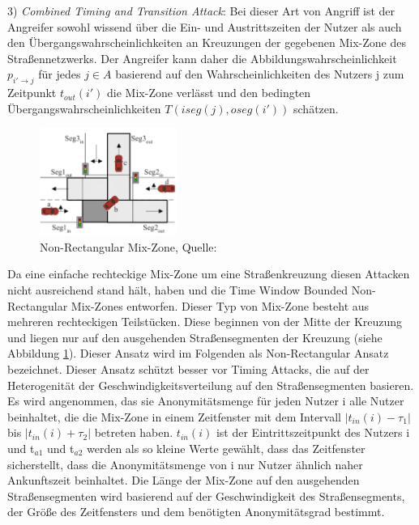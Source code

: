 3)	\textit{Combined  Timing and Transition Attack}: Bei dieser Art von Angriff ist der Angreifer sowohl wissend über die Ein- und Austrittszeiten der Nutzer als auch den Übergangswahrscheinlichkeiten an Kreuzungen der gegebenen Mix-Zone des Straßennetzwerks. Der Angreifer kann  daher die Abbildungswahrscheinlichkeit $p_{i'\rightarrow j}$ für jedes $j \in A$ basierend auf den Wahrscheinlichkeiten des Nutzers j zum Zeitpunkt $t_{out}(i')$ die Mix-Zone verlässt und den bedingten Übergangswahrscheinlichkeiten $T(iseg(j), oseg(i'))$ schätzen. 

\begin{figure}[!h]
	\centering
	\includegraphics[width=0.4\textwidth]{Bilder/nonrectangularMix.PNG}
	\caption{Non-Rectangular Mix-Zone, Quelle: \protect\cite{Chow2011}}
	\label{fig_MixSrasseNon}
\end{figure}

Da eine einfache rechteckige Mix-Zone um eine Straßenkreuzung diesen Attacken nicht ausreichend stand hält, haben \cite{Palanisamy2015} und \cite{Palanisamy2011} die Time Window Bounded Non-Rectangular Mix-Zones entworfen. Dieser Typ von Mix-Zone besteht aus mehreren rechteckigen Teilstücken.  Diese beginnen von der Mitte der Kreuzung und liegen nur auf den ausgehenden Straßensegmenten der Kreuzung (siehe Abbildung \ref{fig_MixSrasseNon}). Dieser Ansatz wird im Folgenden als Non-Rectangular Ansatz bezeichnet. Dieser Ansatz schützt besser vor Timing Attacks, die auf der Heterogenität der Geschwindigkeitsverteilung auf den Straßensegmenten basieren. Es wird angenommen, das sie Anonymitätsmenge für jeden Nutzer i alle Nutzer beinhaltet, die die Mix-Zone in einem Zeitfenster mit dem Intervall $| t_{in}(i)-\tau_{1}|$ bis $|t_{in}(i)+\tau_{2}|$ betreten haben. $t_{in}(i)$ ist der Eintrittszeitpunkt des Nutzers i und t$_{a1}$ und t$_{a2}$ werden als so kleine Werte gewählt, dass das Zeitfenster sicherstellt, dass die Anonymitätsmenge von i nur Nutzer ähnlich naher Ankunftszeit beinhaltet. Die Länge der Mix-Zone auf den ausgehenden Straßensegmenten  wird basierend auf der Geschwindigkeit des Straßensegments, der Größe des Zeitfensters und dem benötigten Anonymitätsgrad bestimmt.     